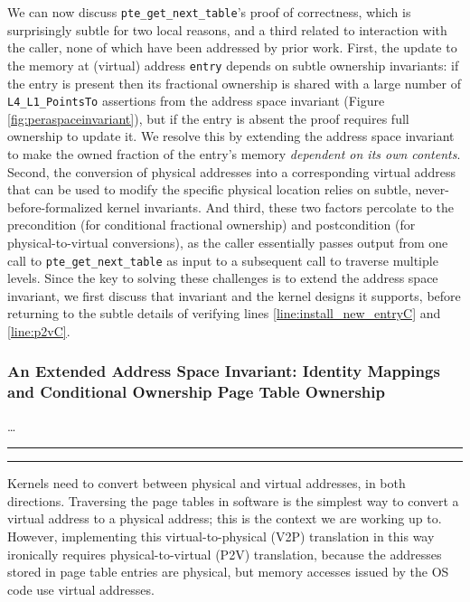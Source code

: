We can now discuss \lstinline|pte_get_next_table|'s proof of correctness, which is surprisingly subtle for two
local reasons, and a third related to interaction with the caller, none of which have been addressed by prior work.
First, the update to the memory at (virtual) address \lstinline|entry| depends on subtle ownership invariants:
if the entry is present then its fractional ownership is shared with a large number of \lstinline|L4_L1_PointsTo| assertions
from the address space invariant (Figure \ref{fig:peraspaceinvariant}),
but if the entry is absent the proof requires full ownership to update it. We resolve this by extending the address space invariant
to make the owned fraction of the entry's memory \emph{dependent on its own contents}.
Second, the conversion of physical addresses into a corresponding virtual address that can be used to modify the specific
physical location relies on subtle, never-before-formalized kernel invariants.
And third, these two factors percolate to the precondition (for conditional fractional ownership) and postcondition
(for physical-to-virtual conversions), as the caller essentially passes output from one call to \lstinline|pte_get_next_table|
as input to a subsequent call to traverse multiple levels.
Since the key to solving these challenges is to extend the address space invariant, we
first discuss that invariant and the kernel designs it supports, before returning to the subtle details of
verifying lines \ref{line:install_new_entryC} and \ref{line:p2vC}.


\subsubsection{An Extended Address Space Invariant: Identity Mappings and Conditional Ownership Page Table Ownership}
\label{subsec:identitymappingsC}

\ldots
\hrule\hrule

Kernels need to convert between physical and virtual addresses, in both directions.
Traversing the page tables in software is the simplest way to convert a virtual address to a physical address; this is the context we are working up to.
However, implementing this virtual-to-physical (V2P) translation in this way ironically requires physical-to-virtual (P2V) translation,
because the addresses stored in page table entries are physical, but memory accesses issued by the OS code use virtual addresses.

